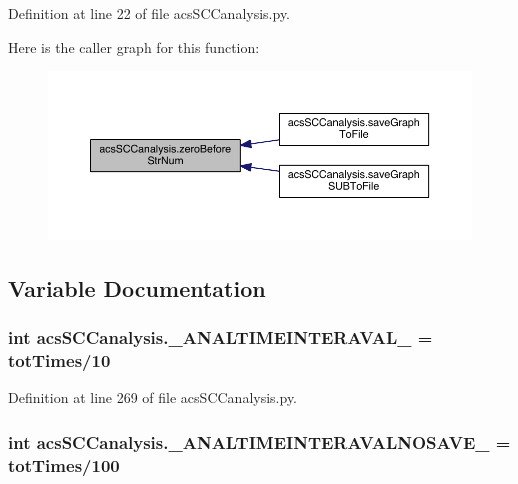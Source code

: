 Definition at line 22 of file acs\-S\-C\-Canalysis.\-py.



Here is the caller graph for this function\-:\nopagebreak
\begin{figure}[H]
\begin{center}
\leavevmode
\includegraphics[width=350pt]{a00102_ab46df2a2027edcf1b07fc012b691b9d6_icgraph}
\end{center}
\end{figure}




\subsection{Variable Documentation}
\hypertarget{a00102_a46f1fb71bdcdb1c8679ae847d0d4b63f}{
\subsubsection[{\-\_\-\-A\-N\-A\-L\-T\-I\-M\-E\-I\-N\-T\-E\-R\-A\-V\-A\-L\-\_\-}]{\setlength{\rightskip}{0pt plus 5cm}int acs\-S\-C\-Canalysis.\-\_\-\-A\-N\-A\-L\-T\-I\-M\-E\-I\-N\-T\-E\-R\-A\-V\-A\-L\-\_\- = {\bf tot\-Times}/10}}\label{a00102_a46f1fb71bdcdb1c8679ae847d0d4b63f}


Definition at line 269 of file acs\-S\-C\-Canalysis.\-py.

\hypertarget{a00102_a7665e828ed7f27f4ba353e9645ad716d}{
\subsubsection[{\-\_\-\-A\-N\-A\-L\-T\-I\-M\-E\-I\-N\-T\-E\-R\-A\-V\-A\-L\-N\-O\-S\-A\-V\-E\-\_\-}]{\setlength{\rightskip}{0pt plus 5cm}int acs\-S\-C\-Canalysis.\-\_\-\-A\-N\-A\-L\-T\-I\-M\-E\-I\-N\-T\-E\-R\-A\-V\-A\-L\-N\-O\-S\-A\-V\-E\-\_\- = {\bf tot\-Times}/100}}\label{a00102_a7665e828ed7f27f4ba353e9645ad716d}


